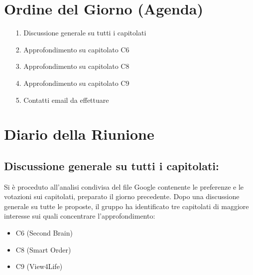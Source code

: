 \documentclass[a4paper, 11pt, oneside]{scrartcl} %
\begin{document}
\section{Ordine del Giorno (Agenda)}
\begin{itemize}
    \item[1.] Discussione generale su tutti i capitolati
    \item[2.] Approfondimento su capitolato C6
    \item[3.] Approfondimento su capitolato C8
    \item[4.] Approfondimento su capitolato C9
    \item[5.] Contatti email da effettuare
\end{itemize}

\newpage
\section{Diario della Riunione}

\subsection{Discussione generale su tutti i capitolati:}

Si è proceduto all'analisi condivisa del file Google contenente le preferenze e le votazioni sui capitolati, preparato il giorno precedente. Dopo una discussione generale su tutte le proposte, il gruppo ha identificato tre capitolati di maggiore interesse sui quali concentrare l'approfondimento:
\begin{itemize}
    \item C6 (Second Brain)
    \item C8 (Smart Order)
    \item C9 (View4Life)
\end{itemize}
\end{document}
